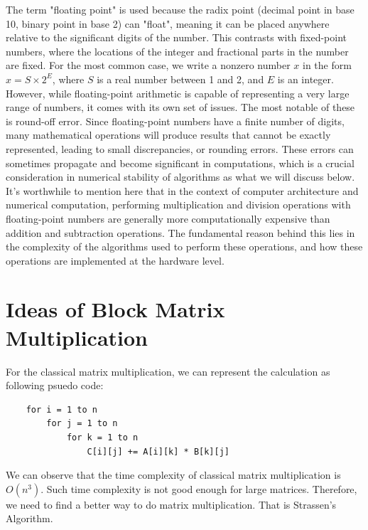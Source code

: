\documentclass{article}
\begin{document}
The term "floating point" is used because the radix point (decimal point in base 10, binary point in base 2) can "float", meaning it can be placed 
anywhere relative to the significant digits of the number. This contrasts with fixed-point numbers, where the locations of the integer and 
fractional parts in the number are fixed. For the most common case, we write a nonzero number $x$ in the form $x = S \times 2^E$, where $S$ is a 
real number between 1 and 2, and $E$ is an integer.\\

However, while floating-point arithmetic is capable of representing a very large range of numbers, it comes with its own set of issues. The most 
notable of these is round-off error. Since floating-point numbers have a finite number of digits, many mathematical operations will produce results 
that cannot be exactly represented, leading to small discrepancies, or rounding errors. These errors can sometimes propagate and become significant 
in computations, which is a crucial consideration in numerical stability of algorithms as what we will discuss below.\\

It's worthwhile to mention here that in the context of computer architecture and numerical computation, performing multiplication and division 
operations with floating-point numbers are generally more computationally expensive than addition and subtraction operations. The fundamental 
reason behind this lies in the complexity of the algorithms used to perform these operations, and how these operations are implemented at the 
hardware level.


\section{Ideas of Block Matrix Multiplication}
\hspace{5.5mm}For the classical matrix multiplication, we can represent the calculation as following psuedo code:
\begin{verbatim}
    for i = 1 to n
        for j = 1 to n
            for k = 1 to n
                C[i][j] += A[i][k] * B[k][j]
\end{verbatim}

We can observe that the time complexity of classical matrix multiplication is $O(n^3)$. Such time complexity is not good enough for
large matrices. Therefore, we need to find a better way to do matrix multiplication. That is Strassen's Algorithm.\\
\end{document}
